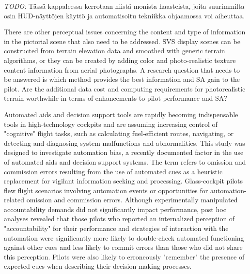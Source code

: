 \documentclass[utf8,bachelor,manualbib]{gradu3}
\begin{document}
\emph{TODO:}
Tässä kappaleessa kerrotaan niistä monista haasteista, joita suurimmilta osin HUD-näyttöjen käyttö ja automatisoitu tekniikka ohjaamossa voi aiheuttaa.

There are other perceptual issues concerning the content and type of information
in the pictorial scene that also need to be addressed. SVS display scenes can
be constructed from terrain elevation data and smoothed with generic terrain algorithms,
or they can be created by adding color and photo-realistic texture content
information from aerial photographs. A research question that needs to be
answered is which method provides the best information and SA gain to the pilot.
Are the additional data cost and computing requirements for photorealistic
terrain worthwhile in terms of enhancements to pilot performance and SA? \citep{prinzel2004}

Automated aids and decision support tools are rapidly becoming indispensable tools
in high-technology cockpits and are assuming increasing control of "cognitive" flight
tasks, such as calculating fuel-efficient routes, navigating, or detecting and diagnosing
system malfunctions and abnormalities. This study was designed to investigate
automation bias, a recently documented factor in the use of automated aids and
decision support systems. The term refers to omission and commission errors resulting
from the use of automated cues as a heuristic replacement for vigilant information
seeking and processing. Glass-cockpit pilots flew flight scenarios involving automation
events or opportunities for automation-related omission and commission errors.
Although experimentally manipulated accountability demands did not significantly
impact performance, post hoc analyses revealed that those pilots who reported an
internalized perception of "accountability" for their performance and strategies of
interaction with the automation were significantly more likely to double-check
automated functioning against other cues and less likely to commit errors than those
who did not share this perception. Pilots were also likely to erroneously "remember"
the presence of expected cues when describing their decision-making processes. \citep{mosier1998}
\end{document}
